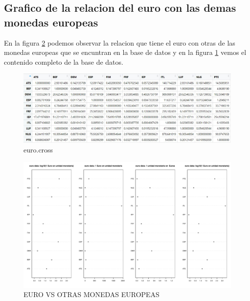 \documentclass[12pt,a4paper]{article}
\begin{document}
\subsection{Grafico de la relacion del euro con las demas monedas europeas}
En la figura \ref{fig:G1} podemos observar la relacion que tiene el euro con otras de las monedas europeas que se encuntran en la base de datos y en la figura \ref{fig:T1} vemos el contenido completo de la base de datos.
\begin{figure}
\centering
\includegraphics[scale=.6]{T1}
\caption{euro.cross}
\label{fig:T1}
\end{figure}
\begin{figure}
\centering
\includegraphics[scale=.5]{G1}
\caption{EURO VS OTRAS MONEDAS EUROPEAS}
\label{fig:G1}
\end{figure}
\newpage
\end{document}
